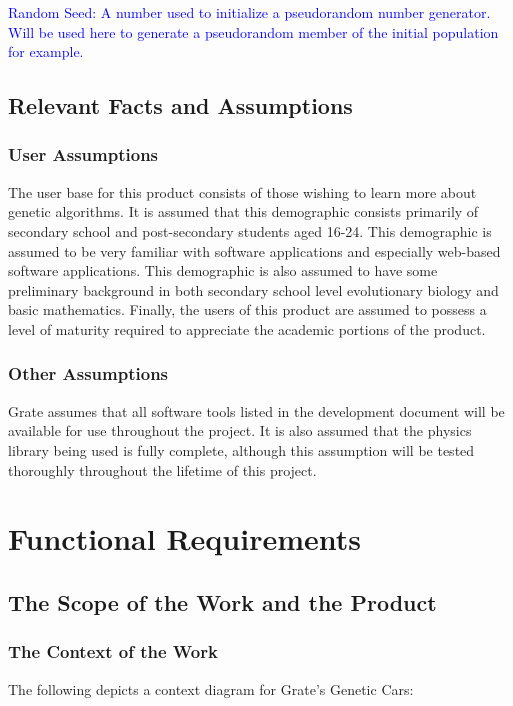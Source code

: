 \documentclass[12pt, titlepage]{article}
\begin{document}
\textcolor{blue}{Random Seed: A number used to initialize a pseudorandom number 
generator. Will be used here to generate a pseudorandom member of the initial 
population for example.}\\

\subsection{Relevant Facts and Assumptions}

\subsubsection{User Assumptions}

The user base for this product consists of those wishing to learn more about 
genetic algorithms. It is assumed that this demographic consists primarily of 
secondary school and post-secondary students aged 16-24. This demographic is 
assumed to be very familiar with software applications and especially web-based 
software applications. This demographic is also assumed to have some preliminary 
background in both secondary school level evolutionary biology and basic 
mathematics. Finally, the users of this product are assumed to possess a level 
of maturity required to appreciate the academic portions of the product.

\subsubsection{Other Assumptions}

Grate assumes that all software tools listed in the development document will be 
available for use throughout the project. It is also assumed that the physics 
library being used is fully complete, although this assumption will be tested 
thoroughly throughout the lifetime of this project.

\newpage

\section{Functional Requirements}

\subsection{The Scope of the Work and the Product}

\subsubsection{The Context of the Work}
The following depicts a context diagram for Grate's Genetic Cars:
\end{document}
